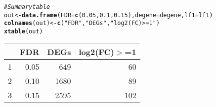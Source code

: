 \documentclass{article}\usepackage[]{graphicx}\usepackage[]{color}
\makeatletter
\newcommand{\hlnum}[1]{\textcolor[rgb]{0.686,0.059,0.569}{#1}}%
\newcommand{\hlstr}[1]{\textcolor[rgb]{0.192,0.494,0.8}{#1}}%
\newcommand{\hlcom}[1]{\textcolor[rgb]{0.678,0.584,0.686}{\textit{#1}}}%
\newcommand{\hlstd}[1]{\textcolor[rgb]{0.345,0.345,0.345}{#1}}%
\newcommand{\hlkwb}[1]{\textcolor[rgb]{0.69,0.353,0.396}{#1}}%
\newcommand{\hlkwc}[1]{\textcolor[rgb]{0.333,0.667,0.333}{#1}}%
\newcommand{\hlkwd}[1]{\textcolor[rgb]{0.737,0.353,0.396}{\textbf{#1}}}%
\newenvironment{kframe}{%
 \def\at@end@of@kframe{}%
 \ifinner\ifhmode%
  \def\at@end@of@kframe{\end{minipage}}%
  \begin{minipage}{\columnwidth}%
 \fi\fi%
 \def\FrameCommand##1{\hskip\@totalleftmargin \hskip-\fboxsep
 \colorbox{shadecolor}{##1}\hskip-\fboxsep
     \hskip-\linewidth \hskip-\@totalleftmargin \hskip\columnwidth}%
 \MakeFramed {\advance\hsize-\width
   \@totalleftmargin\z@ \linewidth\hsize
   \@setminipage}}%
 {\par\unskip\endMakeFramed%
 \at@end@of@kframe}
\makeatother
\begin{document}
\begin{kframe}
\begin{alltt}
\hlcom{# Summary table}
\hlstd{out} \hlkwb{<-} \hlkwd{data.frame}\hlstd{(}\hlkwc{FDR} \hlstd{=} \hlkwd{c}\hlstd{(}\hlnum{0.05}\hlstd{,} \hlnum{0.1}\hlstd{,} \hlnum{0.15}\hlstd{),} \hlkwc{degene} \hlstd{= degene,} \hlkwc{lf1} \hlstd{= lf1)}
\hlkwd{colnames}\hlstd{(out)} \hlkwb{<-} \hlkwd{c}\hlstd{(}\hlstr{"FDR"}\hlstd{,} \hlstr{"DEGs"}\hlstd{,} \hlstr{"log2(FC)>=1"}\hlstd{)}
\hlkwd{xtable}\hlstd{(out)}
\end{alltt}
\end{kframe}%
\begin{table}[ht]
\centering
\begin{tabular}{rrrr}
  \hline
 & FDR & DEGs & log2(FC)$>$=1 \\ 
  \hline
1 & 0.05 & 649 &  60 \\ 
  2 & 0.10 & 1680 &  89 \\ 
  3 & 0.15 & 2595 & 102 \\ 
   \hline
\end{tabular}
\end{table}
\end{document}
